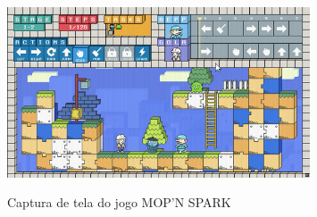 \begin{figure}[H]
	\centering
	\caption{Captura de tela do jogo MOP'N SPARK}
	\includegraphics[width=0.8\textwidth]{images/mop-n-spark.jpg}
	\label{fig:mns}
\end{figure}
